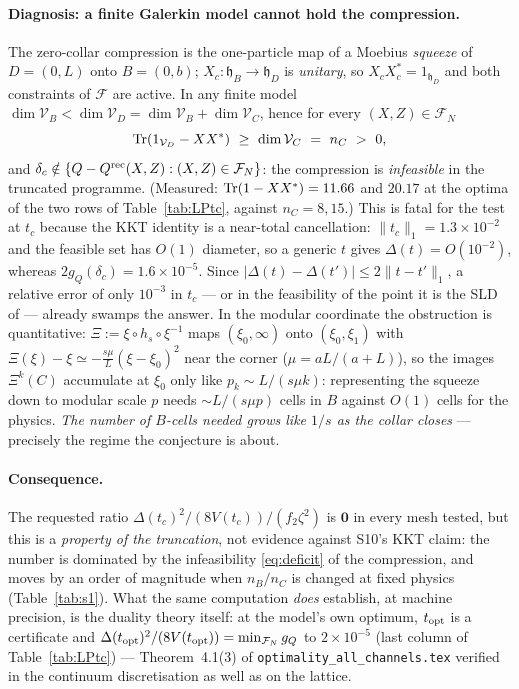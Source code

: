 \documentclass[11pt]{article}
\newcommand{\hh}{\mathfrak h}
\begin{document}
\paragraph{Diagnosis: a finite Galerkin model cannot hold the compression.}
The zero-collar compression is the one-particle map of a Moebius \emph{squeeze} of $D=(0,L)$ onto
$B=(0,b)$; $X_c:\hh_B\to\hh_D$ is \emph{unitary}, so $X_cX_c^*=1_{\hh_D}$ and both constraints of
$\mathcal F$ are active.  In any finite model $\dim\mathcal V_B<\dim\mathcal V_D=\dim\mathcal V_B+\dim\mathcal V_C$,
hence for every $(X,Z)\in\mathcal F_N$
\begin{equation}\label{eq:deficit}
 \operatorname{Tr}(1_{\mathcal V_D}-XX^*)\ \ge\ \dim\mathcal V_C\ =\ n_C\ >\ 0 ,
\end{equation}
and $\delta_c\notin\{Q-Q^{\rm rec}(X,Z):(X,Z)\in\mathcal F_N\}$: the compression is \emph{infeasible}
in the truncated programme.  (Measured: $\operatorname{Tr}(1-XX^*)=11.66$ and $20.17$ at the optima of the two
rows of Table~\ref{tab:LPtc}, against $n_C=8,15$.)  This is fatal for the test at $t_c$ because
the KKT identity is a near-total cancellation: $\|t_c\|_1=1.3\times10^{-2}$ and the feasible set has
$O(1)$ diameter, so a generic $t$ gives $\Delta(t)=O(10^{-2})$, whereas
$2g_Q(\delta_c)=1.6\times10^{-5}$.  Since $|\Delta(t)-\Delta(t')|\le2\|t-t'\|_1$, a relative error of
only $10^{-3}$ in $t_c$ --- or in the feasibility of the point it is the SLD of --- already swamps
the answer.  In the modular coordinate the obstruction is quantitative: $\Xi:=\xi\circ h_s\circ\xi^{-1}$
maps $(\xi_0,\infty)$ onto $(\xi_0,\xi_1)$ with $\Xi(\xi)-\xi\simeq-\frac{s\mu}{L}(\xi-\xi_0)^2$
near the corner ($\mu=aL/(a+L)$), so the images $\Xi^k(C)$ accumulate at $\xi_0$ only like
$p_k\sim L/(s\mu k)$: representing the squeeze down to modular scale $p$ needs
$\sim L/(s\mu p)$ cells in $B$ against $O(1)$ cells for the physics.  \emph{The number of $B$-cells
needed grows like $1/s$ as the collar closes} --- precisely the regime the conjecture is about.

\paragraph{Consequence.}  The requested ratio $\Delta(t_c)^2/(8V(t_c))\big/(f_2\zeta^2)$ is
$\mathbf 0$ in every mesh tested, but this is a \emph{property of the truncation}, not evidence
against S10's KKT claim: the number is dominated by the infeasibility \eqref{eq:deficit} of the
compression, and moves by an order of magnitude when $n_B/n_C$ is changed at fixed physics
(Table~\ref{tab:s1}).  What the same computation \emph{does} establish, at machine precision, is
the duality theory itself: at the model's own optimum, $t_{\rm opt}$ is a certificate and
$\Delta(t_{\rm opt})^2/(8V(t_{\rm opt}))=\min_{\mathcal F_N}g_Q$ to $2\times10^{-5}$
(last column of Table~\ref{tab:LPtc}) --- Theorem~4.1(3) of \texttt{optimality\_all\_channels.tex}
verified in the continuum discretisation as well as on the lattice.
\end{document}
